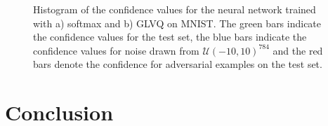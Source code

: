 \documentclass{esannV2}
\begin{document}
\begin{figure}[t]
\caption{Histogram of the confidence values for the neural network trained with a) softmax and b) GLVQ on MNIST. The green bars indicate the confidence values for the test set, the blue bars indicate the confidence values for noise drawn from $\mathcal{U}(-10, 10)^{784}$ and the red bars denote the confidence for adversarial examples on the test set.}
\label{fig:confidence}
\end{figure}


\section{Conclusion}


\begin{footnotesize}





\end{footnotesize}
\end{document}
